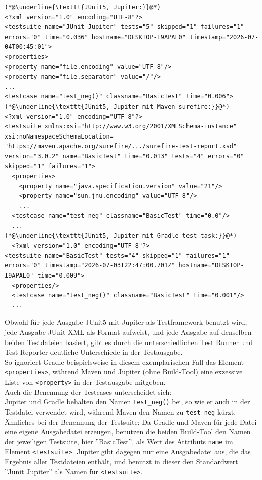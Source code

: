 \begin{lstlisting}[caption={direkter Vergleich von JUnit XML, erzeugt durch JUnit5 mit Jupiter in Java. Jeder Ausgabe liegen dieselben beiden Testdateien zugrunde.\\ ''\textellipsis{}'' bezeichnet gekürzte Stellen.}, label={JAVACompare}]
(*@\underline{\texttt{JUnit5, Jupiter:}}@*)
<?xml version="1.0" encoding="UTF-8"?>
<testsuite name="JUnit Jupiter" tests="5" skipped="1" failures="1" errors="0" time="0.036" hostname="DESKTOP-I9APAL0" timestamp="2026-07-04T00:45:01">
<properties>
<property name="file.encoding" value="UTF-8"/>
<property name="file.separator" value="/"/>
...
<testcase name="test_neg()" classname="BasicTest" time="0.006">
(*@\underline{\texttt{JUnit5, Jupiter mit Maven surefire:}}@*)
<?xml version="1.0" encoding="UTF-8"?>
<testsuite xmlns:xsi="http://www.w3.org/2001/XMLSchema-instance" xsi:noNamespaceSchemaLocation=
"https://maven.apache.org/surefire/.../surefire-test-report.xsd" version="3.0.2" name="BasicTest" time="0.013" tests="4" errors="0" skipped="1" failures="1">
  <properties>
    <property name="java.specification.version" value="21"/>
    <property name="sun.jnu.encoding" value="UTF-8"/>
    ...
  <testcase name="test_neg" classname="BasicTest" time="0.0"/>
  ...
(*@\underline{\texttt{JUnit5, Jupiter mit Gradle test task:}}@*)
  <?xml version="1.0" encoding="UTF-8"?>
<testsuite name="BasicTest" tests="4" skipped="1" failures="1" errors="0" timestamp="2026-07-03T22:47:00.701Z" hostname="DESKTOP-I9APAL0" time="0.009">
  <properties/>
  <testcase name="test_neg()" classname="BasicTest" time="0.001"/>
  ...
\end{lstlisting}
\newpage
Obwohl für jede Ausgabe JUnit5 mit Jupiter als Testframework benutzt wird, jede Ausgabe JUnit XML als Format aufweist, und jede Ausgabe auf denselben beiden Testdateien basiert, gibt es durch die unterschiedlichen Test Runner und Test Reporter deutliche Unterschiede in der Testausgabe.\\
So ignoriert Gradle beispielsweise in diesem exemplarischen Fall das Element \texttt{<properties>}, während Maven und Jupiter (ohne Build-Tool) eine exzessive Liste von \texttt{<property>} in der Testausgabe mitgeben. \\
Auch die Benennung der Testcases unterscheidet sich:\\
Jupiter und Gradle behalten den Namen \texttt{test\_neg()} bei, so wie er auch in der Testdatei verwendet wird, während Maven den Namen zu \texttt{test\_neg} kürzt.\\
Ähnliches bei der Benennung der Testsuite: Da Gradle und Maven für jede Datei eine eigene Ausgabedatei erzeugen, benutzen die beiden Build-Tool den Namen der jeweiligen Testsuite, hier ''BasicTest'', als Wert des Attributs \texttt{name} im Element \texttt{<testsuite>}. Jupiter gibt dagegen nur eine Ausgabedatei aus, die das Ergebnis aller Testdateien enthält, und benutzt in dieser den Standardwert ''Junit Jupiter'' als Namen für \texttt{<testsuite>}.

